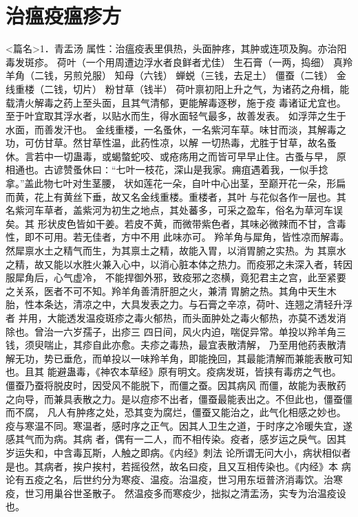 \documentclass[a4paper,12pt,UTF8,twoside]{ctexbook}
\begin{document}
\chapter{治瘟疫瘟疹方}
<篇名>1．青盂汤
属性：治瘟疫表里俱热，头面肿疼，其肿或连项及胸。亦治阳毒发斑疹。 
荷叶（一个用周遭边浮水者良鲜者尤佳） 生石膏（一两，捣细） 真羚羊角（二钱，另煎兑服） 
知母（六钱） 蝉蜕（三钱，去足土） 僵蚕（二钱） 金线重楼（二钱，切片） 粉甘草（钱半） 
荷叶禀初阳上升之气，为诸药之舟楫，能载清火解毒之药上至头面，且其气清郁，更能解毒逐秽，施于疫 
毒诸证尤宜也。至于叶宜取其浮水者，以贴水而生，得水面轻气最多，故善发表。 
如浮萍之生于水面，而善发汗也。 
金线重楼，一名蚤休，一名紫河车草。味甘而淡，其解毒之功，可仿甘草。然甘草性温，此药性凉，以解 
一切热毒，尤胜于甘草，故名蚤休。言若中一切蛊毒，或蝎螫蛇咬、或疮疡用之而皆可早早止住。古蚤与早， 
原相通也。古谚赞蚤休曰∶“七叶一枝花，深山是我家。痈疽遇着我，一似手捻拿。”盖此物七叶对生茎腰， 
状如莲花一朵，自叶中心出茎，至巅开花一朵，形扁而黄，花上有黄丝下垂，故又名金线重楼。重楼者，其叶 
与花似各作一层也。其名紫河车草者，盖紫河为初生之地点，其处蕃多，可采之盈车，俗名为草河车误矣。其 
形状皮色皆如干姜。若皮不黄，而微带紫色者，其味必微辣而不甘，含毒性，即不可用。若无佳者，方中不用 
此味亦可。 
羚羊角与犀角，皆性凉而解毒。然犀禀水土之精气而生，为其禀土之精，故能入胃，以消胃腑之实热。为 
其禀水之精，故又能以水胜火兼入心中，以消心脏本体之热力。而疫邪之未深入者，转因服犀角后，心气虚冷， 
不能捍御外邪，致疫邪之恣横，竟犯君主之宫，此至紧要之关系，医者不可不知。羚羊角善清肝胆之火，兼清 
胃腑之热。其角中天生木胎，性本条达，清凉之中，大具发表之力。与石膏之辛凉，荷叶、连翘之清轻升浮者 
并用，大能透发温疫斑疹之毒火郁热，而头面肿处之毒火郁热，亦莫不透发消除也。曾治一六岁孺子，出疹三 
四日间，风火内迫，喘促异常。单投以羚羊角三钱，须臾喘止，其疹自此亦愈。夫疹之毒热，最宜表散清解， 
乃至用他药表散清解无功，势已垂危，而单投以一味羚羊角，即能挽回，其最能清解而兼能表散可知也。且其 
能避蛊毒，《神农本草经》原有明文。疫病发斑，皆挟有毒疠之气也。 
僵蚕乃蚕将脱皮时，因受风不能脱下，而僵之蚕。因其病风 
而僵，故能为表散药之向导，而兼具表散之力。是以痘疹不出者，僵蚕最能表出之。不但此也，僵蚕僵而不腐， 
凡人有肿疼之处，恐其变为腐烂，僵蚕又能治之，此气化相感之妙也。 
疫与寒温不同。寒温者，感时序之正气。因其人卫生之道，于时序之冷暖失宜，遂感其气而为病。其病 
者，偶有一二人，而不相传染。疫者，感岁运之戾气。因其岁运失和，中含毒瓦斯，人触之即病。《内经》刺法 
论所谓无问大小，病状相似者是也。其病者，挨户挨村，若摇役然，故名曰疫，且又互相传染也。《内经》本 
病论有五疫之名，后世约分为寒疫、温疫。治温疫，世习用东垣普济消毒饮。治寒疫，世习用巢谷世圣散子。 
然温疫多而寒疫少，拙拟之清盂汤，实专为治温疫设也。 
\end{document}
